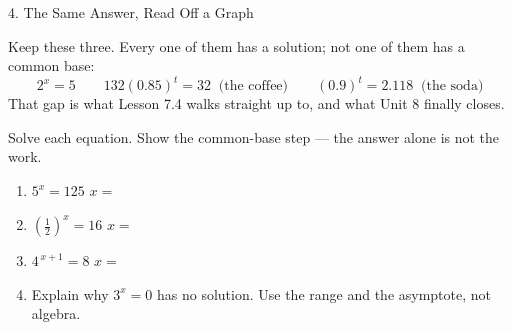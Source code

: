 \documentclass[10pt]{article}
\begin{document}
\begin{notesbox}{4. The Same Answer, Read Off a Graph}
\begin{tcolorbox}[colback=sky, colframe=navy, boxrule=0.8pt, arc=1.5mm,
    left=2.5mm, right=2.5mm, top=1.5mm, bottom=1.5mm]
\vspace{2pt}
Keep these three. Every one of them has a solution; not one of them has a common base:
\[
  2^{x}=5 \qquad 132(0.85)^{t}=32 \;\;\text{(the coffee)} \qquad (0.9)^{t}=2.118 \;\;\text{(the soda)}
\]
That gap is what Lesson 7.4 walks straight up to, and what Unit 8 finally closes.
\end{tcolorbox}
\end{notesbox}

\begin{practicebox}
Solve each equation. Show the common-base step --- the answer alone is not the work.
\begin{enumerate}[leftmargin=1.7em, itemsep=9pt]
  \item $5^{x}=125$ \hfill $x=$ \blank{2.0cm}

  \item $\left(\frac{1}{2}\right)^{x}=16$ \hfill $x=$ \blank{2.0cm}

  \item $4^{\,x+1}=8$ \hfill $x=$ \blank{2.0cm}

  \item Explain why $3^{x}=0$ has no solution. Use the range and the asymptote, not algebra.
\end{enumerate}
\end{practicebox}
\end{document}
